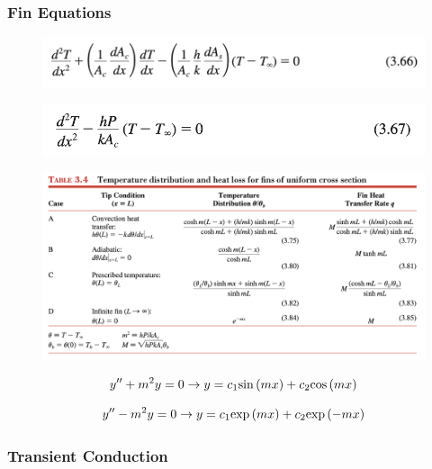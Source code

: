 \documentclass[12pt,letterpaper]{article}
\begin{document}
\clearpage
\subsubsection*{Fin Equations}

\begin{figure}[!htpb]
    \centering
    \includegraphics[width=0.95\linewidth]{./image31a.png}
\end{figure}

\begin{figure}[!htpb]
    \centering
    \includegraphics[width=0.95\linewidth]{./image31b.png}
\end{figure}

\begin{figure}[!htpb]
    \centering
    \includegraphics[width=0.95\linewidth]{./image32.png}
\end{figure}

\begin{equation*}
	y'' + m^2 y = 0 \to y = c_1 \mathrm{sin} \left( m x \right) + c_2 \mathrm{cos} \left( m x \right)
\end{equation*}

\begin{equation*}
	y'' - m^2 y = 0 \to y = c_1 \mathrm{exp} \left( m x \right) + c_2 \mathrm{exp} \left(  - m x \right)
\end{equation*}


\clearpage
\subsubsection*{Transient Conduction}
\end{document}
